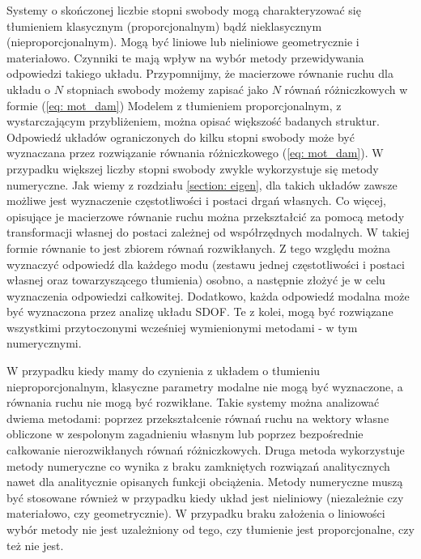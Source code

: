 Systemy o skończonej liczbie stopni swobody mogą charakteryzować się tłumieniem klasycznym (proporcjonalnym) bądź nieklasycznym (nieproporcjonalnym). Mogą być liniowe lub nieliniowe geometrycznie i materiałowo. Czynniki te mają wpływ na wybór metody przewidywania odpowiedzi takiego układu. Przypomnijmy, że macierzowe równanie ruchu dla układu o $N$ stopniach swobody możemy zapisać jako $N$ równań różniczkowych w formie (\ref{eq: mot_dam})
 Modelem z tłumieniem proporcjonalnym, z wystarczającym przybliżeniem, można opisać większość badanych struktur. Odpowiedź układów ograniczonych do kilku stopni swobody może być wyznaczana przez rozwiązanie równania różniczkowego (\ref{eq: mot_dam}). W przypadku większej liczby stopni swobody zwykle wykorzystuje się metody numeryczne. Jak wiemy z rozdziału \ref{section: eigen}, dla takich układów zawsze możliwe jest wyznaczenie częstotliwości i postaci drgań własnych. Co więcej, opisujące je macierzowe równanie ruchu można przekształcić za pomocą metody transformacji własnej do postaci zależnej od współrzędnych modalnych. W takiej formie równanie to jest zbiorem równań rozwikłanych. Z tego względu można wyznaczyć odpowiedź dla każdego modu (zestawu jednej częstotliwości i postaci własnej oraz towarzyszącego tłumienia) osobno, a następnie złożyć je w celu wyznaczenia odpowiedzi całkowitej. Dodatkowo, każda odpowiedź modalna może być wyznaczona przez analizę układu SDOF. Te z kolei, mogą być rozwiązane wszystkimi przytoczonymi wcześniej wymienionymi metodami - w tym numerycznymi.
 
 W przypadku kiedy mamy do czynienia z układem o tłumieniu nieproporcjonalnym, klasyczne parametry modalne nie mogą być wyznaczone, a równania ruchu nie mogą być rozwikłane. Takie systemy można analizować dwiema metodami: poprzez przekształcenie równań ruchu na wektory własne obliczone w zespolonym zagadnieniu własnym lub poprzez bezpośrednie całkowanie nierozwikłanych równań różniczkowych. Druga metoda wykorzystuje metody numeryczne co wynika z braku zamkniętych rozwiązań analitycznych nawet dla analitycznie opisanych funkcji obciążenia. Metody numeryczne muszą być stosowane również w przypadku kiedy układ jest nieliniowy (niezależnie czy materiałowo, czy geometrycznie). W przypadku braku założenia o liniowości wybór metody nie jest uzależniony od tego, czy tłumienie jest proporcjonalne, czy też nie jest.
 
